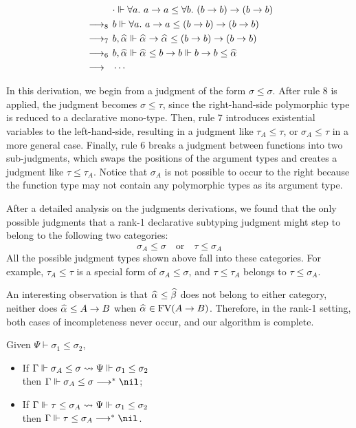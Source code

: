 $$\begin{aligned}
           & \cdot \Vdash \all a \to a \le \all[b] (b \to b) \to (b \to b)\\
    \rrule{8} & b \Vdash \all a \to a \le (b \to b) \to (b \to b)\\
    \rrule{7} & b, \al \Vdash \al \to \al \le (b \to b) \to (b \to b)\\
    \rrule{6} & b, \al \Vdash \al \le b \to b \Vdash b \to b \le \al\\
    \rrule{} & \cdots
\end{aligned}$$

In this derivation, we begin from a judgment of the form $\sigma \le \sigma$.
After rule 8 is applied, the judgment becomes $\sigma \le \tau$,
since the right-hand-side polymorphic type is reduced to a declarative mono-type.
Then, rule 7 introduces existential variables to the left-hand-side,
resulting in a judgment like $\tau_A \le \tau$,
or $\sigma_A \le \tau$ in a more general case.
Finally, rule 6 breaks a judgment between functions into two sub-judgments,
which swaps the positions of the argument types
and creates a judgment like $\tau \le \tau_A$.
Notice that $\sigma_A$ is not possible to occur to the right
because the function type may not contain any polymorphic types as its argument type.

After a detailed analysis on the judgments derivations,
we found that the only possible judgments that a rank-1 declarative subtyping judgment
might step to belong to the following two categories:
$$\sigma_A \le \sigma \quad\text{or}\quad \tau \le \sigma_A$$
All the possible judgment types shown above fall into these categories.
For example, $\tau_A \le \tau$ is a special form of $\sigma_A \le \sigma$,
and $\tau \le \tau_A$ belongs to $\tau \le \sigma_A$.

An interesting observation is that $\al \le \bt$ does not belong to either category,
neither does $\al \le A \to B$ when $\al \in \text{FV}(A \to B)$.
Therefore, in the rank-1 setting, both cases of incompleteness never occur,
and our algorithm is complete.

\begin{theorem}
    Given $\Psi \vdash \sigma_1 \le \sigma_2$,
    \begin{itemize}
        \item If $\Gamma \Vdash \sigma_A \le \sigma \rightsquigarrow \Psi \Vdash \sigma_1 \le \sigma_2$
            \\then $\Gm \Vdash \sigma_A \le \sigma \redto \nil$;
        \item If $\Gamma \Vdash \tau \le \sigma_A \rightsquigarrow \Psi \Vdash \sigma_1 \le \sigma_2$
            \\then $\Gm \Vdash \tau \le \sigma_A \redto \nil$.
    \end{itemize}
\end{theorem}

